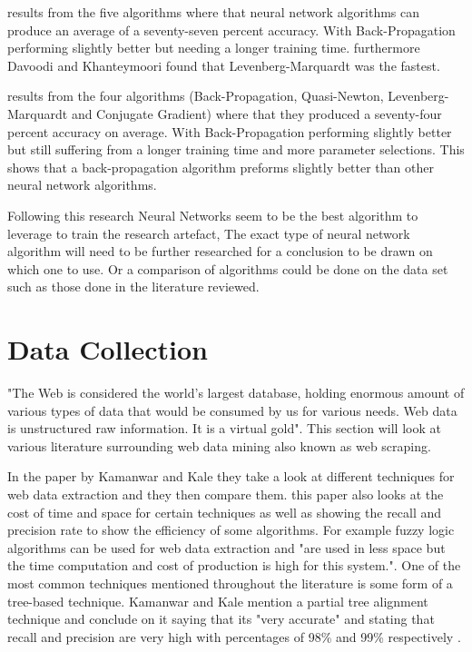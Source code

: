 \cite{Davoodi2010HorseRP} results from the five algorithms where that neural network algorithms can produce an average of a seventy-seven percent accuracy. With Back-Propagation performing slightly better but needing a longer training time. furthermore Davoodi and Khanteymoori found that Levenberg-Marquardt was the fastest.

\cite{HorseJamacia} results from the four algorithms (Back-Propagation, Quasi-Newton, Levenberg-Marquardt and Conjugate Gradient) where that they produced a seventy-four percent accuracy on average. With Back-Propagation performing slightly better but still suffering from a longer training time and more parameter selections. This shows that a back-propagation algorithm preforms slightly better than other neural network algorithms.

Following this research Neural Networks seem to be the best algorithm to leverage to train the research artefact, The exact type of neural network algorithm will need to be further researched for a conclusion to be drawn on which one to use. Or a comparison of algorithms could be done on the data set such as those done in the literature reviewed.


\section{Data Collection}

"The Web is considered the world's largest database, holding enormous amount of various types of data that would be consumed by us for various needs. Web data is unstructured raw information. It is a virtual gold"\cite{8186676}. This section will look at various literature surrounding web data mining also known as web scraping. 

In the paper by Kamanwar and Kale they take a look at different techniques for web data extraction and they then compare them. this paper also looks at the cost of time and space for certain techniques as well as showing the recall and precision rate to show the efficiency of some algorithms. For example fuzzy logic algorithms can be used for web data extraction and "are used in less space but the time computation and cost of production is high for this system."\cite{7583910}. One of the most common techniques mentioned throughout the literature is some form of a tree-based technique. Kamanwar and Kale mention a partial tree alignment technique and conclude on it saying that its "very accurate" and stating that recall and precision are very high with percentages of 98\% and 99\% respectively \cite{7583910}.

